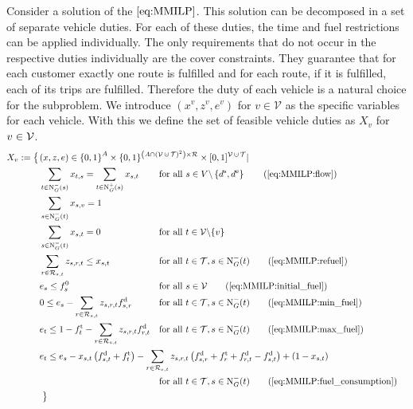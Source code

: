 Consider a solution of the $\eqref{eq:MMILP}$. This solution can be decomposed in a set of separate vehicle duties. For each of these duties, the time and fuel restrictions can be applied individually. The only requirements that do not occur in the respective duties individually are the cover constraints. They guarantee that for each customer exactly one route is fulfilled and for each route, if it is fulfilled, each of its trips are fulfilled. Therefore the duty of each vehicle is a natural choice for the subproblem. We introduce $\left(x^v,z^v,e^v\right)$ for $v\in\mathcal{V}$ as the specific variables for each vehicle. With this we define the set of feasible vehicle duties as $X_v$ for $v\in\mathcal{V}$.
\begin{align}
	X_v := \left\{\vphantom{\{0,1\}^A}\right. & \omit\rlap{$\displaystyle{(x,z,e)\in\left\{0,1\right\}^A \times \{0,1\}^{\left(A\cap\left(\mathcal{V}\cupdot\mathcal{T}\right)^2\right)\times\mathcal{R}} \times [0,1]^{\mathcal{V}\cupdot\mathcal{T}}|}$} \nonumber \\
	& \sum_{t\in\Nin(s)} x_{t,s} = \sum_{t\in\Nout(s)} x_{s,t} && \text{for all } s\in V\backslash\left\{d^{\operatorname{s}},d^{\operatorname{e}}\right\} \tag{\ref{eq:MMILP:flow}} \\
	& \sum_{s\in\Nin(t)} x_{s,v} = 1 \label{eq:Xv:vehicle} \\
	& \sum_{s\in\Nin(t)} x_{s,t} = 0 && \text{for all } t\in\mathcal{V}\backslash\{v\} \label{eq:Xv:other_vehicles} \\
	& \sum_{r\in\Rst} z_{s,r,t} \leq x_{s,t} & & \text{for all } t\in\mathcal{T}, s\in\Nin(t) \tag{\ref{eq:MMILP:refuel}} \\
	& e_s \leq f_s^0 & & \text{for all } s\in\mathcal{V} \tag{\ref{eq:MMILP:initial_fuel}} \\
	& 0 \leq e_s - \sum_{r\in\Rst} z_{s,r,t}\fd_{s,r} & & \text{for all } t\in\mathcal{T}, s\in\Nin(t) \tag{\ref{eq:MMILP:min_fuel}} \\
	& e_t \leq 1 - \ft_t - \sum_{r\in\Rst} z_{s,r,t}\fd_{r,t} & & \text{for all } t\in\mathcal{T}, s\in\Nin(t) \tag{\ref{eq:MMILP:max_fuel}} \\
	& \omit\rlap{$\displaystyle{e_t \leq e_s - x_{s,t}\left(f_{s,t}^{\operatorname{d}}+f_t^{\operatorname{t}}\right) - \sum_{r\in\Rst} z_{s,r,t}\left(\fd_{s,r}+\ft_r+\fd_{r,t}-\fd_{s,t}\right) + \left(1-x_{s,t}\right)}$} \nonumber \\
	& & & \text{for all } t\in\mathcal{T}, s\in\Nin(t) \tag{\ref{eq:MMILP:fuel_consumption}} \\
	& \left. \vphantom{\{0,1\}^A} \right\} \nonumber
\end{align}

